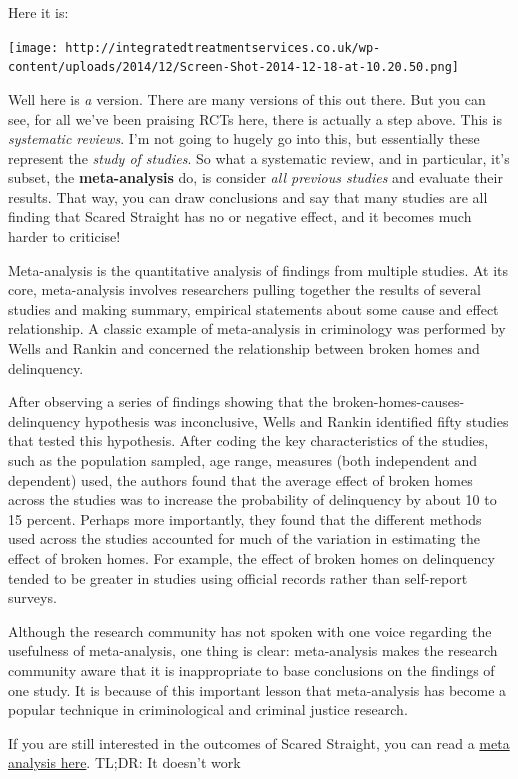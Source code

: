\documentclass[]{book}
\theoremstyle{definition}
\theoremstyle{definition}
\theoremstyle{definition}
\theoremstyle{remark}
\begin{document}
Here it is:

\texttt{[image: http://integratedtreatmentservices.co.uk/wp-content/uploads/2014/12/Screen-Shot-2014-12-18-at-10.20.50.png]}

Well here is \emph{a} version. There are many versions of this out
there. But you can see, for all we've been praising RCTs here, there is
actually a step above. This is \emph{systematic reviews}. I'm not going
to hugely go into this, but essentially these represent the \emph{study
of studies}. So what a systematic review, and in particular, it's
subset, the \textbf{meta-analysis} do, is consider \emph{all previous
studies} and evaluate their results. That way, you can draw conclusions
and say that many studies are all finding that Scared Straight has no or
negative effect, and it becomes much harder to criticise!

Meta-analysis is the quantitative analysis of findings from multiple
studies. At its core, meta-analysis involves researchers pulling
together the results of several studies and making summary, empirical
statements about some cause and effect relationship. A classic example
of meta-analysis in criminology was performed by Wells and Rankin and
concerned the relationship between broken homes and delinquency.

After observing a series of findings showing that the
broken-homes-causes-delinquency hypothesis was inconclusive, Wells and
Rankin identified fifty studies that tested this hypothesis. After
coding the key characteristics of the studies, such as the population
sampled, age range, measures (both independent and dependent) used, the
authors found that the average effect of broken homes across the studies
was to increase the probability of delinquency by about 10 to 15
percent. Perhaps more importantly, they found that the different methods
used across the studies accounted for much of the variation in
estimating the effect of broken homes. For example, the effect of broken
homes on delinquency tended to be greater in studies using official
records rather than self-report surveys.

Although the research community has not spoken with one voice regarding
the usefulness of meta-analysis, one thing is clear: meta-analysis makes
the research community aware that it is inappropriate to base
conclusions on the findings of one study. It is because of this
important lesson that meta-analysis has become a popular technique in
criminological and criminal justice research.

If you are still interested in the outcomes of Scared Straight, you can
read a
\href{http://onlinelibrary.wiley.com/doi/10.1002/14651858.CD002796.pub2/full}{meta
analysis here}. TL;DR: It doesn't work
\end{document}
